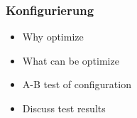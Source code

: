 \subsubsection{Konfigurierung}
\label{ssub:konfigurierung}
  \begin{itemize}
    \item Why optimize
    \item What can be optimize
    \item A-B test of configuration
    \item Discuss test results
  \end{itemize}
